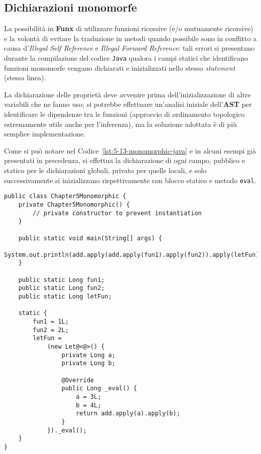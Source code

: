 \subsection{Dichiarazioni monomorfe}
\label{sec:5-13-monomorphic-declarations}

La possibilità in \textbf{Funx} di utilizzare funzioni ricorsive (e/o mutuamente ricorsive)
e la volontà di evitare la traduzione in metodi quando possibile sono in conflitto
a causa d'\textit{Illegal Self Reference} e \textit{Illegal Forward Reference}:
tali errori si presentano durante la compilazione del codice \texttt{Java}
qualora i campi statici che identificano funzioni monomorfe vengano dichiarati e inizializzati
nello stesso \textit{statement} (stessa linea).


La dichiarazione delle proprietà deve avvenire prima dell'inizializzazione di altre variabili che ne fanno uso;
si potrebbe effettuare un'analisi iniziale dell'\textbf{AST} per identificare le dipendenze tra le funzioni
(approccio di ordinamento topologico estremamente utile anche per l'inferenza), ma la soluzione adottata
è di più semplice implementazione.


Come si può notare nel Codice~\ref{lst:5-13-monomorphic-java} e in alcuni esempi già presentati in precedenza,
si effettua la dichiarazione di ogni campo, pubblico e statico per le dichiarazioni globali, privato per quelle locali,
e solo successivamente si inizializzano rispettivamente con blocco statico e metodo \texttt{eval}.

\vspace{4mm}
\begin{lstlisting}[caption={Esempio di traduzione per funzioni monomorfe}, style=javaCode, label={lst:5-13-monomorphic-java}]
public class Chapter5Monomorphic {
    private Chapter5Monomorphic() {
        // private constructor to prevent instantiation
    }
    
    public static void main(String[] args) {
        System.out.println(add.apply(add.apply(fun1).apply(fun2)).apply(letFun));
    }
    
    public static Long fun1;    
    public static Long fun2;    
    public static Long letFun;
    
    static {
        fun1 = 1L;    
        fun2 = 2L;    
        letFun =
            (new Let@<@>() {
                private Long a;    
                private Long b;
    
                @Override
                public Long _eval() {
                    a = 3L;
                    b = 4L;
                    return add.apply(a).apply(b);
                }
            })._eval();
    }
}
\end{lstlisting}


